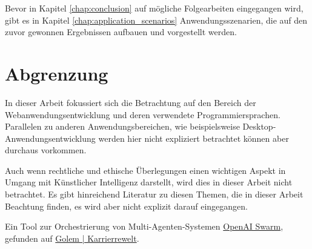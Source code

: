 Bevor in Kapitel \ref{chap:conclusion} auf mögliche Folgearbeiten eingegangen wird, gibt es in Kapitel \ref{chap:application_scenarios} Anwendungsszenarien, die auf den zuvor gewonnen Ergebnissen aufbauen und vorgestellt werden.


\section{Abgrenzung}
In dieser Arbeit fokussiert sich die Betrachtung auf den Bereich der Webanwendungsentwicklung und deren verwendete Programmiersprachen. Parallelen zu anderen Anwendungsbereichen, wie beispielsweise Desktop-Anwendungsentwicklung werden hier nicht expliziert betrachtet können aber durchaus vorkommen.\vspace{0.2cm}

Auch wenn rechtliche und ethische Überlegungen einen wichtigen Aspekt in Umgang mit Künstlicher Intelligenz darstellt, wird dies in dieser Arbeit nicht betrachtet. Es gibt hinreichend Literatur zu diesen Themen, die in dieser Arbeit Beachtung finden, es wird aber nicht explizit darauf eingegangen.\vspace{0.2cm}

\begin{tcolorbox}[
	enhanced,
	breakable,
	colback=red!5!white,
	colframe=red!75!black!50,
	title= Mein roter Faden: noch was zum Testen
	]
	Ein Tool zur Orchestrierung von Multi-Agenten-Systemen \href{https://community.openai.com/t/introducing-swarm-js-node-js-implementation-of-openai-swarm/977510}{OpenAI Swarm}, gefunden auf \href{https://karrierewelt.golem.de/blogs/karriere-ratgeber/bot-belegschaft-mit-entlastungspotenzial-ki-agenten-fur-den-arbeitsalltag-in-der-testphase-1}{Golem | Karrierrewelt}.
\end{tcolorbox}
